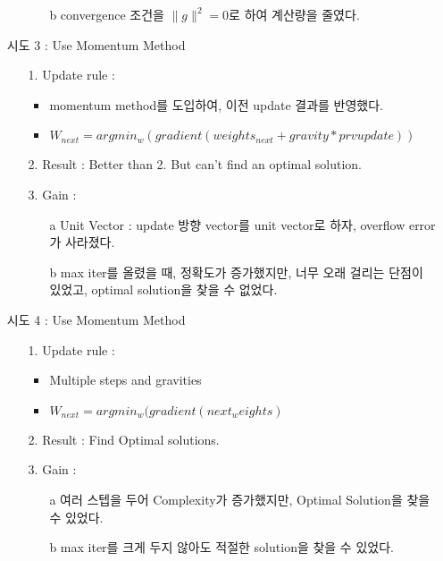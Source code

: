 \documentclass{article}
\begin{document}
\begin{itemize}
\begin{itemize}
\begin{itemize}
                        \item[b] convergence 조건을 $\|g\|^2 = 0$로 하여 계산량을 줄였다.
                    \end{itemize}
            \end{itemize}
        \item[] 시도 3 : Use Momentum Method  
            \begin{itemize}
                \item[1.] Update rule : 
                    \begin{itemize}
                        \item momentum method를 도입하여, 이전 update 결과를 반영했다.
                        \item $W_{next} = argmin_w{(gradient(weights_{next} + gravity * {prv update}))}$
                    \end{itemize}
                \item[2.] Result : Better than 2. But can't find an optimal solution.
                \item[3.] Gain : 
                    \begin{itemize}
                        \item[a] Unit Vector : update 방향 vector를 unit vector로 하자, overflow error가 사라졌다.
                        \item[b] max iter를 올렸을 때, 정확도가 증가했지만, 너무 오래 걸리는 단점이 있었고, optimal solution을 찾을 수 없었다.
                    \end{itemize}
            \end{itemize}
        
        \item[] 시도 4 : Use Momentum Method  
            \begin{itemize}
                \item[1.] Update rule : 
                    \begin{itemize}
                        \item Multiple steps and gravities
                        \item $W_{next} = argmin_w{(gradient(next_weights)}$
                    \end{itemize}
                \item[2.] Result : Find Optimal solutions.
                \item[3.] Gain : 
                    \begin{itemize}
                        \item[a] 여러 스텝을 두어 Complexity가 증가했지만, Optimal Solution을 찾을 수 있었다.
                        \item[b] max iter를 크게 두지 않아도 적절한 solution을 찾을 수 있었다.
                    \end{itemize}
            \end{itemize}
    \end{itemize}
\end{document}

